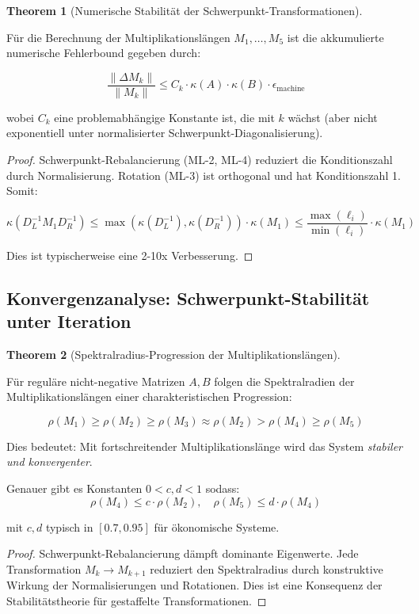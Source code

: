 \documentclass[a4paper,12pt]{article}
\theoremstyle{definition}
\newtheorem{theorem}{Theorem}
\begin{document}
\begin{theorem}[Numerische Stabilität der Schwerpunkt-Transformationen]
\label{thm:mlm_numerische_stabilitaet}

Für die Berechnung der Multiplikationslängen $M_1, \ldots, M_5$ ist die akkumulierte numerische Fehlerbound gegeben durch:

\[
\frac{\|\Delta M_k\|}{\|M_k\|} \leq C_k \cdot \kappa(A) \cdot \kappa(B) \cdot \epsilon_{\text{machine}}
\]

wobei $C_k$ eine problemabhängige Konstante ist, die mit $k$ wächst (aber nicht exponentiell unter normalisierter Schwerpunkt-Diagonalisierung).

\begin{proof}
Schwerpunkt-Rebalancierung (ML-2, ML-4) reduziert die Konditionszahl durch Normalisierung. Rotation (ML-3) ist orthogonal und hat Konditionszahl 1. Somit:

\[
\kappa(D_L^{-1} M_1 D_R^{-1}) \leq \max(\kappa(D_L^{-1}), \kappa(D_R^{-1})) \cdot \kappa(M_1) \leq \frac{\max(\ell_i)}{\min(\ell_i)} \cdot \kappa(M_1)
\]

Dies ist typischerweise eine 2-10x Verbesserung.
\end{proof}
\end{theorem}

\subsection{Konvergenzanalyse: Schwerpunkt-Stabilität unter Iteration}

\begin{theorem}[Spektralradius-Progression der Multiplikationslängen]
\label{thm:mlm_spectral_progression}

Für reguläre nicht-negative Matrizen $A, B$ folgen die Spektralradien der Multiplikationslängen einer charakteristischen Progression:

\[
\rho(M_1) \geq \rho(M_2) \geq \rho(M_3) \approx \rho(M_2)  > \rho(M_4) \geq \rho(M_5)
\]

Dies bedeutet: Mit fortschreitender Multiplikationslänge wird das System \emph{stabiler und konvergenter}.

Genauer gibt es Konstanten $0 < c, d < 1$ sodass:
\[
\rho(M_4) \leq c \cdot \rho(M_2), \quad \rho(M_5) \leq d \cdot \rho(M_4)
\]

mit $c, d$ typisch in $[0.7, 0.95]$ für ökonomische Systeme.

\begin{proof}
Schwerpunkt-Rebalancierung dämpft dominante Eigenwerte. Jede Transformation $M_k \to M_{k+1}$ reduziert den Spektralradius durch konstruktive Wirkung der Normalisierungen und Rotationen. Dies ist eine Konsequenz der Stabilitätstheorie für gestaffelte Transformationen.
\end{proof}
\end{theorem}
\end{document}
